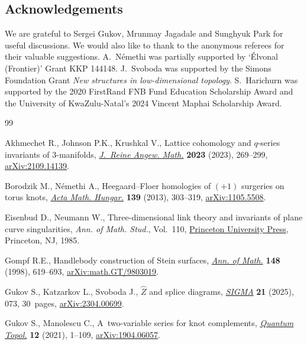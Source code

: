 \documentclass[10pt,a4paper]{amsart}
\begin{document}
\subsection*{Acknowledgements}

We are grateful to Sergei Gukov, Mrunmay Jagadale and Sunghyuk Park for useful discussions. We would also like to thank to the anonymous referees for their valuable suggestions. A.~N\'emethi was partially supported by `\'Elvonal (Frontier)' Grant KKP 144148. J.~Svoboda was supported by the Simons Foundation Grant {\it New structures in low-dimensional topology}. S.~Harichurn was supported by the 2020 FirstRand FNB Fund Education Scholarship Award and the University of KwaZulu-Natal's 2024 Vincent Maphai Scholarship Award.

\begin{thebibliography}{99}
\footnotesize\itemsep=0pt

Akhmechet R., Johnson P.K., Krushkal V., Lattice cohomology and {$q$}-series
 invariants of 3-manifolds,
 \href{https://doi.org/10.1515/crelle-2022-0096}{\textit{J.~Reine Angew.
 Math.}} \textbf{2023} (2023), 269--299,
 \href{http://arxiv.org/abs/2109.14139}{arXiv:2109.14139}.

Borodzik M., N\'emethi A., Heegaard--{F}loer homologies of {$(+1)$} surgeries
 on torus knots, \href{https://doi.org/10.1007/s10474-012-0280-x}{\textit{Acta
 Math. Hungar.}} \textbf{139} (2013), 303--319,
 \href{http://arxiv.org/abs/1105.5508}{arXiv:1105.5508}.

Eisenbud D., Neumann W., Three-dimensional link theory and invariants of plane
 curve singularities, \textit{Ann. of Math. Stud.}, Vol.~110,
 \href{https://doi.org/10.1515/9781400881925}{Princeton University Press},
 Princeton, NJ, 1985.

Gompf R.E., Handlebody construction of {S}tein surfaces,
 \href{https://doi.org/10.2307/121005}{\textit{Ann. of Math.}} \textbf{148}
 (1998), 619--693,
 \href{http://arxiv.org/abs/math.GT/9803019}{arXiv:math.GT/9803019}.

Gukov S., Katzarkov L., Svoboda J., {$\widehat{Z}$} and splice diagrams,
 \href{https://doi.org/10.3842/SIGMA.2025.073}{\textit{SIGMA}} \textbf{21}
 (2025), 073, 30~pages,
 \href{http://arxiv.org/abs/2304.00699}{arXiv:2304.00699}.

Gukov S., Manolescu C., A~two-variable series for knot complements,
 \href{https://doi.org/10.4171/qt/145}{\textit{Quantum Topol.}} \textbf{12}
 (2021), 1--109, \href{http://arxiv.org/abs/1904.06057}{arXiv:1904.06057}.


\end{thebibliography}
\end{document}
